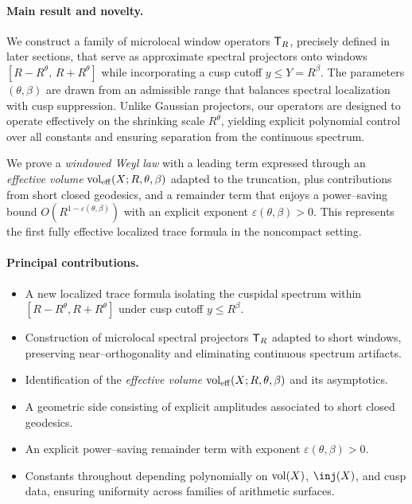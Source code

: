 \paragraph{Main result and novelty.}
We construct a family of microlocal window operators $\mathsf{T}_R$, precisely defined in later
sections, that serve as approximate spectral projectors onto windows
$[R-R^{\theta},\,R+R^{\theta}]$ while incorporating a cusp cutoff $y \leq Y = R^\beta$.
The parameters $(\theta,\beta)$ are drawn from an admissible range that balances spectral
localization with cusp suppression. Unlike Gaussian projectors, our operators are
designed to operate effectively on the shrinking scale $R^\theta$, yielding explicit
polynomial control over all constants and ensuring separation from the continuous
spectrum. 

We prove a \emph{windowed Weyl law} with a leading term expressed through an
\emph{effective volume} $\operatorname{vol}_{\mathrm{eff}}(X;R,\theta,\beta)$ adapted to the truncation,
plus contributions from short closed geodesics, and a remainder term that enjoys a
power–saving bound $O(R^{1-\varepsilon(\theta,\beta)})$ with an explicit exponent
$\varepsilon(\theta,\beta)>0$. This represents the first fully effective localized trace
formula in the noncompact setting.

\paragraph{Principal contributions.}
\begin{itemize}
  \item A new localized trace formula isolating the cuspidal spectrum within
        $[R-R^\theta,R+R^\theta]$ under cusp cutoff $y \leq R^\beta$.
  \item Construction of microlocal spectral projectors $\mathsf{T}_R$ adapted to short windows,
        preserving near–orthogonality and eliminating continuous spectrum artifacts.
  \item Identification of the \emph{effective volume}
        $\operatorname{vol}_{\mathrm{eff}}(X;R,\theta,\beta)$ and its asymptotics.
  \item A geometric side consisting of explicit amplitudes associated to short closed
        geodesics.
  \item An explicit power–saving remainder term with exponent
        $\varepsilon(\theta,\beta)>0$.
  \item Constants throughout depending polynomially on $\operatorname{vol}(X)$, $\inj(X)$, and cusp
        data, ensuring uniformity across families of arithmetic surfaces.
\end{itemize}

